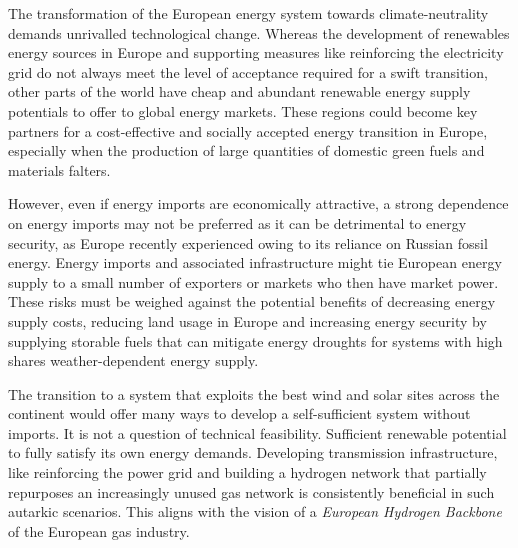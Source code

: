 
The transformation of the European energy system towards climate-neutrality
demands unrivalled technological change. Whereas the development of renewables
energy sources in Europe and supporting measures like reinforcing the
electricity grid do not always meet the level of acceptance required for a swift
transition, other parts of the world have cheap and abundant renewable energy
supply potentials to offer to global energy
markets.\cite{irenaGlobalHydrogen2022,luxSupplyCurves2021,vanderzwaanTimmermansDream2021,fasihiLongTermHydrocarbon2017,reichenbergDeepDecarbonization2022,galvanExportingSunshine2022,armijoFlexibleProduction2020,pfennigGlobalGISbased2022}
These regions could become key partners for a cost-effective and socially
accepted energy transition in Europe, especially when the production of
large quantities of domestic green fuels and materials falters.


However, even if energy imports are economically attractive, a strong dependence
on energy imports may not be preferred as it can be detrimental to energy
security, as Europe recently experienced owing to its reliance on Russian fossil
energy.\cite{pedersenLongtermImplications2022} Energy imports and associated
infrastructure might tie European energy supply to a small number of exporters
or markets who then have market power. These risks must be weighed against the
potential benefits of decreasing energy supply costs, reducing land usage in
Europe and increasing energy security by supplying storable fuels that can
mitigate energy droughts for systems with high shares weather-dependent energy
supply.



The transition to a system that exploits the
best wind and solar sites across the continent would offer many ways to develop
a self-sufficient system without
imports.\cite{pickeringDiversityOptions2022,brownSynergiesSector2018} It is not
a question of technical feasibility. Sufficient renewable potential to fully satisfy its own energy demands. Developing transmission infrastructure,
like reinforcing the power grid and building a hydrogen network that partially
repurposes an increasingly unused gas network is consistently beneficial in such
autarkic
scenarios.\cite{nneumannPotentialRole2023,wetzelGreenEnergy2022,victoriaSpeedTechnological2022}
This aligns with the vision of a \textit{European Hydrogen Backbone} of the
European gas industry.
\cite{gasforclimateEuropeanHydrogen2020,gasforclimateEuropeanHydrogen2022}

